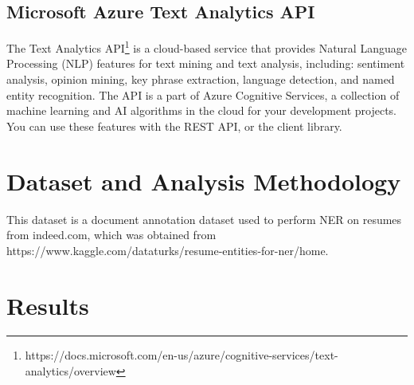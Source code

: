 \documentclass[conference]{IEEEtran}
\begin{document}
\subsection{Microsoft Azure Text Analytics API}

The Text Analytics API\footnote{https://docs.microsoft.com/en-us/azure/cognitive-services/text-analytics/overview} is a cloud-based service that provides Natural Language Processing (NLP) features for text mining and text analysis, including: sentiment analysis, opinion mining, key phrase extraction, language detection, and named entity recognition.
The API is a part of Azure Cognitive Services, a collection of machine learning and AI algorithms in the cloud for your development projects. You can use these features with the REST API, or the client library.

\section{Dataset and Analysis Methodology}

This dataset is a document annotation dataset used to perform NER on resumes from indeed.com, which was obtained from https://www.kaggle.com/dataturks/resume-entities-for-ner/home.


\section{Results}
\end{document}
